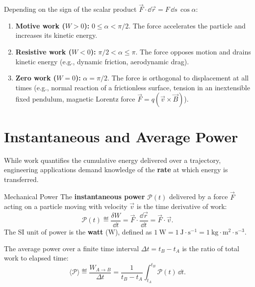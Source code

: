 Depending on the sign of the scalar product $\vec{F}\cdot\dd\vec{r} = F\,\dd s\,\cos\alpha$:
\begin{enumerate}[leftmargin=1.4em,itemsep=3pt]
  \item \textbf{Motive work ($W > 0$):} $0 \le \alpha < \pi/2$. The force accelerates the particle and increases its kinetic energy.
  \item \textbf{Resistive work ($W < 0$):} $\pi/2 < \alpha \le \pi$. The force opposes motion and drains kinetic energy (e.g., dynamic friction, aerodynamic drag).
  \item \textbf{Zero work ($W = 0$):} $\alpha = \pi/2$. The force is orthogonal to displacement at all times (e.g., normal reaction of a frictionless surface, tension in an inextensible fixed pendulum, magnetic Lorentz force $\vec{F} = q(\vec{v}\times\vec{B})$).
\end{enumerate}

\section{Instantaneous and Average Power}

While work quantifies the cumulative energy delivered over a trajectory, engineering applications demand knowledge of the \textbf{rate} at which energy is transferred.

\begin{definitionbox}{Mechanical Power}
The \textbf{instantaneous power} $\mathcal{P}(t)$ delivered by a force $\vec{F}$ acting on a particle moving with velocity $\vec{v}$ is the time derivative of work:
\begin{equation}
\mathcal{P}(t) \eqdef \frac{\delta W}{\dd t} = \vec{F} \cdot \frac{\dd\vec{r}}{\dd t} = \vec{F} \cdot \vec{v}.
\end{equation}
The SI unit of power is the \textbf{watt} ($\mathrm{W}$), defined as $1\ \mathrm{W} = 1\ \mathrm{J\cdot s^{-1}} = 1\ \mathrm{kg\cdot m^2\cdot s^{-3}}$.
\end{definitionbox}

The average power over a finite time interval $\Delta t = t_B - t_A$ is the ratio of total work to elapsed time:
\begin{equation}
\langle \mathcal{P} \rangle \eqdef \frac{W_{A \to B}}{\Delta t} = \frac{1}{t_B - t_A} \int_{t_A}^{t_B} \mathcal{P}(t)\,\dd t.
\end{equation}

